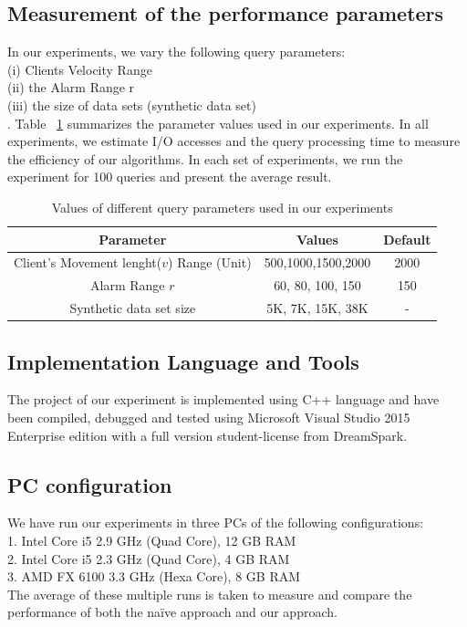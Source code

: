 \subsection{Measurement of the performance parameters}
In our experiments, we vary the following query parameters:\\ (i) Clients Velocity Range\\ (ii) the Alarm Range r\\ (iii) the size of data sets (synthetic data set)\\. Table ~\ref{table:exp_setup} summarizes the parameter values used in our experiments. In all experiments, we estimate I/O accesses and the query processing time to measure the efficiency of our algorithms. In each set of experiments, we run the experiment for 100 queries and present the average result.
\vspace*{10pt}
\begin{table}[htbp]
  \centering

\begin{tabular}{|c|c|c|}  \hline
  Parameter& Values & Default\\
  \hline
  Client’s Movement lenght($ v $) Range (Unit) & 500,1000,1500,2000 &2000 \\
  \hline
  Alarm Range $r$& 60, 80, 100, 150 &150\\
  \hline
  Synthetic data set size & 5K, 7K, 15K, 38K & - \\
  \hline
\end{tabular}
\caption{Values of different query parameters used in our experiments} \label{table:exp_setup} \vspace{-2mm}
\end{table}


\subsection{Implementation Language and Tools}
The project of our experiment is implemented using C++ language and have been compiled, debugged and tested using Microsoft Visual Studio 2015 Enterprise edition with a full version student-license from DreamSpark.

\subsection{PC configuration}
We have run our experiments in three PCs of the following configurations:\\
1. Intel Core i5 2.9 GHz (Quad Core), 12 GB RAM \\
2. Intel Core i5 2.3 GHz (Quad Core), 4 GB RAM \\
3. AMD FX 6100 3.3 GHz (Hexa Core), 8 GB RAM \\
The average of these multiple runs is taken to measure and compare the performance of both the naïve approach and our approach.


